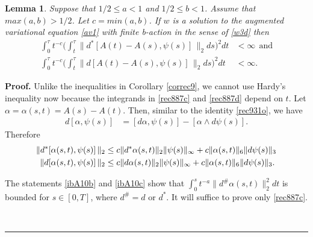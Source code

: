 \documentclass[12pt]{article}
\newtheorem{lemma}[theorem]{Lemma}
\newenvironment{proof}[1][Proof]{\textbf{#1.} }{\ \rule{0.5em}{0.5em}}
\def \({\Big(}
\def \){\Big)}
\def \eref{\eqref}
\numberwithin{equation}{section}
\begin{document}
\begin{lemma}\label{lemrecef} 
Suppose that $1/2 \le a < 1$ and $1/2\le b <1$. Assume that $max(a,b) > 1/2$.  Let $c = min(a,b)$.
 If $w$ is a solution to the augmented variational equation \eref{av1} with 
 finite b-action in the sense of \eref{w3d}   then 
\begin{align}
\int_0^\tau t^{-c}\( \int_t^\tau \| d^*[A(t) - A(s), \psi(s)]\, \|_2 ds \)^2 dt &< \infty\ \ \text{and}  \label{rec887c}\\
\int_0^\tau t^{-c}\( \int_t^\tau \| d[A(t) - A(s), \psi(s)]\, \|_2 ds \)^2 dt &< \infty.        \label{rec887d}
\end{align}
\end{lemma}
       \begin{proof}  Unlike the inequalities in Corollary \ref{correc9}, we cannot use Hardy's inequality now
       because the integrands in \eref{rec887c} and \eref{rec887d} depend on $t$.
       Let $\alpha =\alpha(s,t) = A(s) -A(t)$. Then, similar to the identity \eref{rec931o}, we have
       \begin{align}
d[\alpha, \psi(s)] &= [d\alpha, \psi(s)]    
               -[\alpha \wedge d\psi(s)]  .         \label{rec932o}
\end{align}  
Therefore
 \begin{align}
\| d^*[\alpha(s,t), \psi(s)]\, \|_2         
&\le  c\|d^*\alpha(s,t)\|_2 \|\psi(s)\|_\infty +c \|\alpha(s,t)\|_6 \| d \psi(s)\|_3     \label{rec902c}    \\
\| d[\alpha(s,t), \psi(s)]\, \|_2         
&\le  c\|d\alpha(s,t)\|_2 \|\psi(s)\|_\infty +c \|\alpha(s,t)\|_6 \| d \psi(s)\|_3  .        \notag                  
\end{align} 

The statements   \eref{ibA10b} and \eref{ibA10c} show that $\int_0^s t^{-a} \| d^\# \alpha(s,t)\|_2^2 dt$
is bounded for $s \in [0, T]$, where $d^\# = d$ or $d^*$. It will suffice to prove only \eref{rec887c}.


\end{proof}
\end{document}
